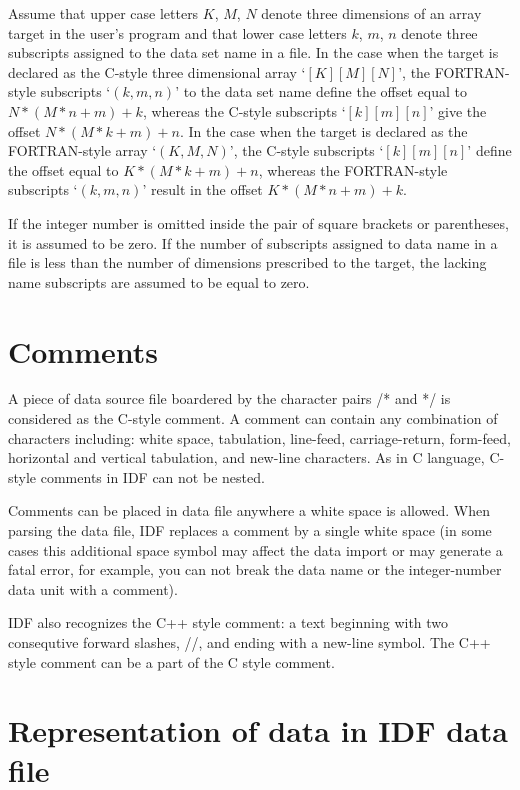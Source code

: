 Assume that upper case letters $K$, $M$, $N$
denote three dimensions of an array target
in the user's program
and that lower case letters $k$, $m$, $n$
denote three subscripts assigned to the data set name in a file.
In the case when the target is declared as the C-style
three dimensional array `$[K][M][N]$',
the FORTRAN-style subscripts `$(k,m,n)$' to the data set name
define the offset equal to $N*(M*n+m)+k$,
whereas the C-style subscripts `$[k][m][n]$'
give the offset $N*(M*k+m)+n$.
In the case when the target is declared as the FORTRAN-style
array `$(K,M,N)$',
the C-style subscripts `$[k][m][n]$'
define the offset equal to $K*(M*k+m)+n$,
whereas the FORTRAN-style subscripts `$(k,m,n)$'
result in the offset $K*(M*n+m)+k$.

If the integer number is omitted inside 
the pair of square brackets or parentheses,
it is assumed to be zero.
If the number of subscripts assigned to data name in a file
is less than the number of dimensions prescribed to the target,
the lacking name subscripts are assumed to be equal to zero.
 

\section{Comments}

A piece of data source file boardered by the character pairs /* and */
is considered as the C-style comment. A comment can contain any combination
of characters including: white space, tabulation, line-feed,
carriage-return, form-feed, horizontal and vertical tabulation,
and new-line characters.
As in  C language, C-style comments in IDF can not be nested.

Comments can be placed in data file anywhere a white space is allowed.
When parsing the data file, IDF replaces a comment by a single
white space (in some cases this additional
space symbol may affect the data import or may generate a fatal error,
for example,
you can not break the data name or the integer-number data unit
with a comment).

IDF also recognizes the C++ style comment: a text beginning with
two consequtive forward slashes, //, and ending with a new-line symbol.
The C++ style comment can be a part of the C style comment.

\section {Representation of data in IDF data file}

